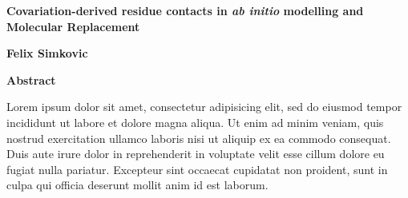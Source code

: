 \pagestyle{plain}
\begin{center}
    \Large
    \textbf{Covariation-derived residue contacts in \textit{ab initio} modelling and Molecular Replacement}
    
    \vspace{0.4cm}
    \textbf{Felix Simkovic}
    
    \vspace{0.9cm}
    \textbf{Abstract}
\end{center}

Lorem ipsum dolor sit amet, consectetur adipisicing elit, sed do eiusmod tempor incididunt ut labore et dolore magna
aliqua. Ut enim ad minim veniam, quis nostrud exercitation ullamco laboris nisi ut aliquip ex ea commodo consequat. Duis
aute irure dolor in reprehenderit in voluptate velit esse cillum dolore eu fugiat nulla pariatur. Excepteur sint
occaecat cupidatat non proident, sunt in culpa qui officia deserunt mollit anim id est laborum.
